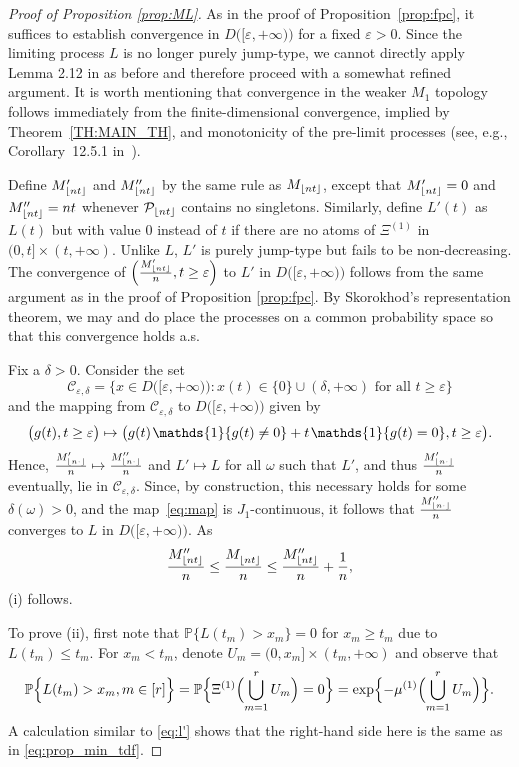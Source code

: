 \documentclass[11pt]{article}
\newcommand{\hs}{\hspace{1pt}}
\newcommand{\1}[1][]{
	\ifx&#1&\mathds{1}
	\else\mathds{1}\left\{#1\right\}\fi}
\newcommand{\Cc}{\mathcal{C}_{\eps,\delta}}
\newcommand{\Pc}{\mathcal{P}}
\newcommand{\eps}{\varepsilon}
\DeclarePairedDelimiter\floor{\lfloor}{\rfloor}
\theoremstyle{definition}
\theoremstyle{remark}
\numberwithin{equation}{section}
\begin{document}
	\begin{proof}[Proof of Proposition \ref{prop:ML}]
		As in the proof of Proposition~\ref{prop:fpc}, it suffices to establish convergence in $D\bigl([\eps,+\infty)\bigr)$ for a fixed $\eps>0$. Since the limiting process $L$ is no longer purely jump-type, we cannot directly apply Lemma 2.12 in \cite{X92} as before and therefore proceed with a somewhat refined argument. It is worth mentioning that convergence in the weaker $M_1$ topology follows immediately from the finite-dimensional convergence, implied by Theorem~\ref{TH:MAIN_TH}, and monotonicity of the pre-limit processes (see, e.g., Corollary~12.5.1 in~\cite{W02}).
			
		Define $M'_{\floor{nt}}$ and $M''_{\floor{nt}}$ by the same rule as $M_{\floor{nt}}$, 
		except that $M'_{\floor{nt}}=0$ and $M''_{\floor{nt}}=nt$ whenever $\Pc_{\floor{nt}}$ contains no singletons. 
		Similarly, define $L'(t)$ as $L(t)$ but with value $0$ instead of $t$ if there are no atoms of $\Xi^{(1)}$ in 
		$(0,t]\times(t,+\infty)$. Unlike $L$, $L'$ is purely jump-type but fails to be non-decreasing.
		The convergence of $\Bigl(\frac{M'_{\floor{nt}}}{n}, t\ge\eps\Bigr)$ to $L'$ in $D\bigl([\eps,+\infty)\bigr)$ 
		follows from the same argument as in the proof of Proposition \ref{prop:fpc}. By Skorokhod’s representation theorem, we may and do place the processes on a common probability space so that this convergence holds a.s.
						
		Fix a $\delta>0$. Consider the set
		\[\Cc=\bigl\{x\in D\bigl([\eps,+\infty)\bigr)\colon x(t)\in\{0\}\cup(\delta,+\infty)\text{ for all }t\ge\eps\bigr\}\]
		and the mapping from $\Cc$ to $D\bigl([\eps,+\infty)\bigr)$ given by
		\begin{equation}
		\label{eq:map}
		\bigl(g(t),t\ge\eps\bigr)\mapsto
		\bigl(g(t) \hs \1\{g(t)\ne0\} + t\hs\1\{g(t)=0\}, t\ge\eps\bigr).
		\end{equation}
		Hence, $\frac{M'_{\floor{n\cdot}}}{n} \mapsto \frac{M''_{\floor{n\cdot}}}n$ and $L'\mapsto L$
		for all $\omega$ such that $L'$, and thus $\frac{M'_{\floor{n\cdot}}}{n}$ eventually, lie in $\Cc$.
		Since, by construction, this necessary holds for some $\delta(\omega)>0$, and the map~\eqref{eq:map} is $J_1$-continuous, it follows that $\tfrac{M''_{\floor{n\cdot}}}n$ converges to $L$ in $D\bigl([\eps,+\infty)\bigr)$.			
		As
		\begin{equation*}
			\frac{M''_{\floor{nt}}}{n} \le
			\frac{M^{\vphantom a}_{\floor{nt}}}{n} \le
			\frac{M''_{\floor{nt}}}{n} +\frac{1}{n},
		\end{equation*}
		(i) follows.
		
		To prove (ii), first note that
		$\mathbb{P}\bigl\{L(t_m)>x_m\bigr\} = 0$ for
		$x_m\ge t_m$ due to $L(t_m)\le t_m$. For $x_m < t_m$, denote $U_m = (0,x_m]\times(t_m, +\infty)$ and observe that
		\begin{align*}
			\mathbb{P}\Bigl\{L(t_m) > x_m, m\in[r]\Bigr\} = \mathbb{P}\Bigl\{\Xi^{(1)}\Bigl(\bigcup_{m=1}^r U_m\Bigr) = 0\Bigr\}
			= \exp\Bigl\{-\mu^{(1)}\Bigl(\bigcup_{m=1}^rU_m\Bigr)\Bigr\}.
		\end{align*}
		A calculation similar to \eqref{eq:l'} shows that the right-hand side here is the same as in \eqref{eq:prop_min_tdf}.
	\end{proof}
\end{document}
